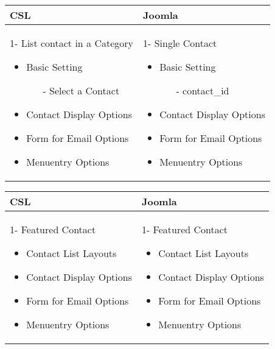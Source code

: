 \begin{minipage}{0.7\textwidth}
\begin{tabular}{|p{} | p{}|}
\hline
\textbf{CSL} & \textbf{Joomla} \\ 
\hline
 1- List contact in a Category
   \begin{itemize}
     \item Basic  Setting 
    		\begin{enumerate}
    			\item[-] Select a Contact
    		\end{enumerate}
 	\item Contact Display Options
 	\item Form for Email Options
 	\item Menuentry Options
  \end{itemize}
 & 
1- Single Contact
  \begin{itemize}
    \item Basic  Setting 
   		\begin{enumerate}
   			\item[-] contact\_id
   		\end{enumerate}
	\item Contact Display Options
	\item Form for Email Options
	\item Menuentry Options
 \end{itemize}
\\
\hline
\end{tabular}
\end{minipage}

\begin{minipage}{0.7\textwidth}
\begin{tabular}{|p{} | p{}|}
\hline
\textbf{CSL} & \textbf{Joomla} \\ 
\hline
 1- Featured Contact
 \begin{itemize}
    \item Contact List Layouts
 	\item Contact Display Options
 	\item Form for Email Options
 	\item Menuentry Options
  \end{itemize}
 & 
1- Featured Contact
 \begin{itemize}
   	\item Contact List Layouts
	\item Contact Display Options
	\item Form for Email Options
	\item Menuentry Options
 \end{itemize}
\\
\hline
\end{tabular}
\end{minipage}

